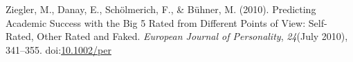 \documentclass[,man,floatsintext]{apa6}
\theoremstyle{definition}
\theoremstyle{definition}
\theoremstyle{definition}
\theoremstyle{remark}
\begin{document}
\leavevmode\hypertarget{ref-Ziegler2010}{}%
Ziegler, M., Danay, E., Schölmerich, F., \& Bühner, M. (2010).
Predicting Academic Success with the Big 5 Rated from Different Points
of View: Self-Rated, Other Rated and Faked. \emph{European Journal of
Personality}, \emph{24}(July 2010), 341--355.
doi:\href{https://doi.org/10.1002/per}{10.1002/per}

\endgroup

\clearpage

\renewcommand{\listtablename}{Table captions}

\listoftables
\end{document}
